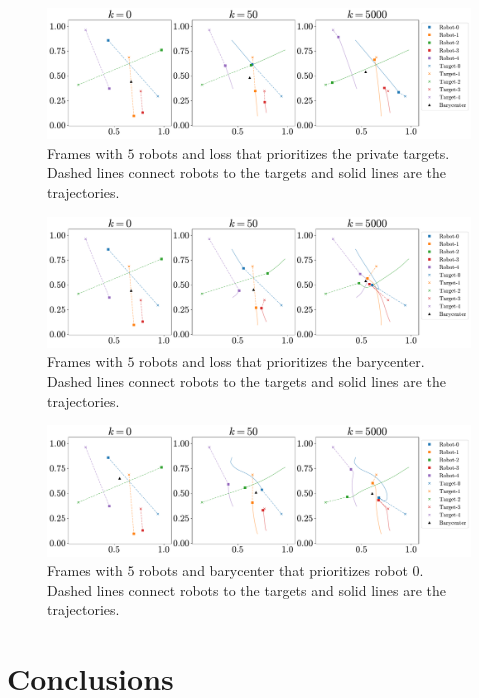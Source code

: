 \documentclass[a4paper,11pt,oneside]{book}
\begin{document}
\begin{figure}[H]
      \centering
      \includegraphics[width=0.9\linewidth]{./figs/aggregative/target_anim/anim.pdf} 
      \caption{Frames with $5$ robots and loss that prioritizes the private targets. Dashed lines connect robots to the targets and solid lines are the trajectories.}
      \label{fig:anim_target}
\end{figure}

\begin{figure}[H]
      \centering
      \includegraphics[width=0.9\linewidth]{./figs/aggregative/barycenter_anim/anim.pdf} 
      \caption{Frames with $5$ robots and loss that prioritizes the barycenter. Dashed lines connect robots to the targets and solid lines are the trajectories.}
      \label{fig:anim_barycenter}
\end{figure}

\begin{figure}[H]
      \centering
      \includegraphics[width=0.9\linewidth]{./figs/aggregative/importance_anim/anim.pdf} 
      \caption{Frames with $5$ robots and barycenter that prioritizes robot $0$. Dashed lines connect robots to the targets and solid lines are the trajectories.}
      \label{fig:anim_importance}
\end{figure}




\chapter*{Conclusions}
\end{document}
